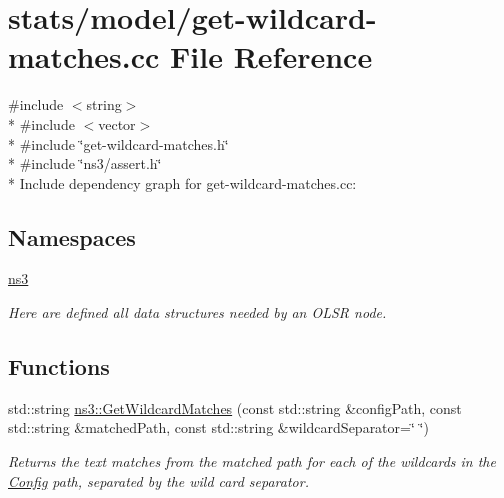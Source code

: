\hypertarget{get-wildcard-matches_8cc}{}\section{stats/model/get-\/wildcard-\/matches.cc File Reference}
\label{get-wildcard-matches_8cc}
{\ttfamily \#include $<$string$>$}\\*
{\ttfamily \#include $<$vector$>$}\\*
{\ttfamily \#include \char`\"{}get-\/wildcard-\/matches.\+h\char`\"{}}\\*
{\ttfamily \#include \char`\"{}ns3/assert.\+h\char`\"{}}\\*
Include dependency graph for get-\/wildcard-\/matches.cc\+:
\subsection*{Namespaces}
\begin{DoxyCompactItemize}
\item 
 \hyperlink{namespacens3}{ns3}
\begin{DoxyCompactList}\small\item\em Here are defined all data structures needed by an O\+L\+SR node. \end{DoxyCompactList}\end{DoxyCompactItemize}
\subsection*{Functions}
\begin{DoxyCompactItemize}
\item 
std\+::string \hyperlink{namespacens3_ab2d3424cd46a0cf26722b70079835354}{ns3\+::\+Get\+Wildcard\+Matches} (const std\+::string \&config\+Path, const std\+::string \&matched\+Path, const std\+::string \&wildcard\+Separator=\char`\"{} \char`\"{})
\begin{DoxyCompactList}\small\item\em Returns the text matches from the matched path for each of the wildcards in the \hyperlink{namespacens3_1_1Config}{Config} path, separated by the wild card separator. \end{DoxyCompactList}\end{DoxyCompactItemize}
